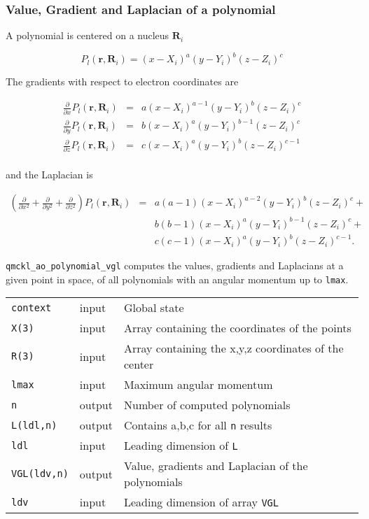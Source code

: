 \subsubsection{Value, Gradient and Laplacian of a polynomial}
\label{sec:org2844591}

A polynomial is centered on a nucleus \(\mathbf{R}_i\)

\[
   P_l(\mathbf{r},\mathbf{R}_i)  =   (x-X_i)^a (y-Y_i)^b (z-Z_i)^c 
   \]

The gradients with respect to electron coordinates are

\begin{eqnarray*} 
\frac{\partial }{\partial x} P_l\left(\mathbf{r},\mathbf{R}_i \right) &
               = & a (x-X_i)^{a-1} (y-Y_i)^b (z-Z_i)^c \\
\frac{\partial }{\partial y} P_l\left(\mathbf{r},\mathbf{R}_i \right) &
               = & b (x-X_i)^a (y-Y_i)^{b-1} (z-Z_i)^c \\
\frac{\partial }{\partial z} P_l\left(\mathbf{r},\mathbf{R}_i \right) &
               = & c (x-X_i)^a (y-Y_i)^b (z-Z_i)^{c-1} \\
\end{eqnarray*} 

and the Laplacian is

\begin{eqnarray*} 
\left( \frac{\partial }{\partial x^2} + 
           \frac{\partial }{\partial y^2} + 
           \frac{\partial }{\partial z^2} \right) P_l
           \left(\mathbf{r},\mathbf{R}_i \right) &  = &  
         a(a-1) (x-X_i)^{a-2} (y-Y_i)^b (z-Z_i)^c + \\
      && b(b-1) (x-X_i)^a (y-Y_i)^{b-1} (z-Z_i)^c + \\
      && c(c-1) (x-X_i)^a (y-Y_i)^b (z-Z_i)^{c-1}.
\end{eqnarray*}

\texttt{qmckl\_ao\_polynomial\_vgl} computes the values, gradients and
Laplacians at a given point in space, of all polynomials with an
angular momentum up to \texttt{lmax}.

\begin{center}
\begin{tabular}{lll}
\texttt{context} & input & Global state\\
\texttt{X(3)} & input & Array containing the coordinates of the points\\
\texttt{R(3)} & input & Array containing the x,y,z coordinates of the center\\
\texttt{lmax} & input & Maximum angular momentum\\
\texttt{n} & output & Number of computed polynomials\\
\texttt{L(ldl,n)} & output & Contains a,b,c for all \texttt{n} results\\
\texttt{ldl} & input & Leading dimension of \texttt{L}\\
\texttt{VGL(ldv,n)} & output & Value, gradients and Laplacian of the polynomials\\
\texttt{ldv} & input & Leading dimension of array \texttt{VGL}\\
\end{tabular}
\end{center}

